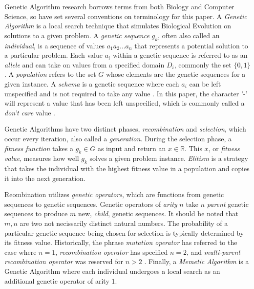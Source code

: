 Genetic Algorithm research borrows terms from both Biology and Computer Science, so have set several conventions on terminology for this paper. A \emph{Genetic Algorithm} is a local search technique that simulates Biological Evolution on solutions to a given problem. A \emph{genetic sequence} $g_k$, often also called an \emph{individual}, is a sequence of values $a_1 a_2\ldots a_n$ that represents a potential solution to a particular problem. Each value $a_i$ within a genetic sequence is referred to as an \emph{allele} and can take on values from a specified domain $D_i$, commonly the set $\{0,1\}$. A \emph{population} refers to the set $G$ whose elements are the genetic sequences for a given instance. A \emph{schema} is a genetic sequence where each $a_i$ can be left unspecified and is not required to take any value \cite{Russell10}. In this paper, the character '-' will represent a value that has been left unspecified, which is commonly called a \emph{don't care} value \cite{Holland75}.

Genetic Algorithms have two distinct phases, \emph{recombination} and \emph{selection}, which occur every iteration, also called a \emph{generation}. During the selection phase, a \emph{fitness function} takes a $g_k \in G$ as input and return an $x \in \mathbb{R}$. This $x$, or \emph{fitness value}, measures how well $g_k$ solves a given problem instance. \emph{Elitism} is a strategy that takes the individual with the highest fitness value in a population and copies it into the next generation.

Reombination utilizes \emph{genetic operators}, which are functions from genetic sequences to genetic sequences. Genetic operators of \emph{arity} $n$ take $n$ \emph{parent} genetic sequences to produce $m$ new, \emph{child}, genetic sequences. It should be noted that $m, n$ are two not necissarily distinct natural numbers. The probability of a particular genetic sequence being chosen for selection is typically determined by its fitness value. Historically, the phrase \emph{mutation operator} has referred to the case where $n = 1$, \emph{recombination operator} has specified $n = 2$, and \emph{multi-parent recombination operator} was reserved for $n > 2$ \cite{Eiben94}. Finally, a \emph{Memetic Algorithm} is a Genetic Algorithm where each individual undergoes a local search as an additional genetic operator of arity 1.